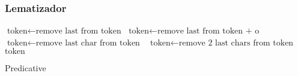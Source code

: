 \documentclass{beamer}
\begin{document}
\begin{frame}
\frametitle{Lematizador}
\begin{algorithm}[H]
\begin{scriptsize}
    \begin{algorithmic}[1]
	 	 $\text{token} \gets \text{remove last from token}$ \EndIf
	 	 $\text{token} \gets \text{remove last from token + o}$ \EndIf 
	 \State $\text{token} \gets \text{remove last char from token}$ \Else $\text{ token} \gets \text{remove 2 last chars from token}$ \EndIf
	\State \Return $\text{token}$
        \EndProcedure
    \end{algorithmic}
    \label{alg:rAP}
    \caption{Predicative}
    \end{scriptsize}
\end{algorithm}
\end{frame}
\end{document}
